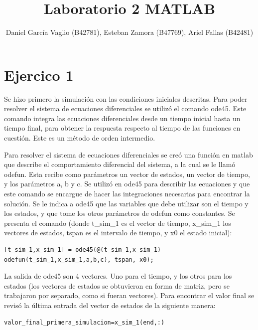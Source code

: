 \documentclass[12pt,letterpaper]{article}
\begin{document}
\title{Laboratorio 2 MATLAB}
\author{Daniel García Vaglio (B42781), Esteban Zamora (B47769), Ariel Fallas (B42481)}
\maketitle

\section{Ejercico 1} 

Se hizo primero la simulación con las condiciones iniciales descritas. Para poder resolver el sistema de ecuaciones diferenciales se utilizó el comando ode45. Este comando integra las ecuaciones diferenciales desde un tiempo inicial hasta un tiempo final, para obtener la respuesta respecto al tiempo de las funciones en cuestión. Este es un método de orden intermedio. 

Para resolver el sistema de ecuaciones diferenciales se creó una función en matlab que describe el comportamiento diferencial del sistema, a la cual se le llamó odefun. Esta recibe como parámetros un vector de estados, un vector de tiempo, y los parámetros a, b y c. Se utilizó en ode45 para describir las ecuaciones y que este comando se encargue de hacer las integraciones necesarias para encontrar la solución. Se le indica  a ode45 que las variables que debe utilizar son el tiempo y los estados, y que tome los otros parámetros de odefun como constantes. Se presenta el comando (donde t\_sim\_1 es el vector de tiempo, x\_sim\_1 los vectores de estados, tspan es el intervalo de tiempo, y x0 el estado inicial):

\begin{lstlisting}[style=Matlab-editor, basicstyle=\mlttfamily]
    [t_sim_1,x_sim_1] = ode45(@(t_sim_1,x_sim_1) odefun(t_sim_1,x_sim_1,a,b,c), tspan, x0);
\end{lstlisting}

La salida de ode45 son 4 vectores. Uno para el tiempo, y los otros para los estados (los vectores de estados se obtuvieron en forma de matriz, pero se trabajaron por separado, como si fueran vectores). Para encontrar el valor final se revisó la última entrada del vector de estados de la siguiente manera:


\begin{lstlisting}[style=Matlab-editor, basicstyle=\mlttfamily]
    valor_final_primera_simulacion=x_sim_1(end,:)
\end{lstlisting}
\end{document}

